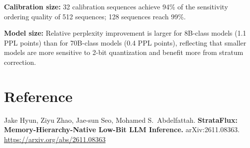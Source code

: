 \documentclass[10pt,twocolumn]{article}
\begin{document}
\textbf{Calibration size:} 32 calibration sequences achieve 94\% of the
sensitivity ordering quality of 512 sequences; 128 sequences reach 99\%.

\textbf{Model size:} Relative perplexity improvement is larger for
8B-class models (1.1 PPL points) than for 70B-class models (0.4 PPL
points), reflecting that smaller models are more sensitive to 2-bit
quantization and benefit more from stratum correction.

\section*{Reference}

Jake Hyun, Ziyu Zhao, Jae-sun Seo, Mohamed S.\ Abdelfattah.
\textbf{StrataFlux: Memory-Hierarchy-Native Low-Bit LLM Inference.}
arXiv:2611.08363.
\url{https://arxiv.org/abs/2611.08363}
\end{document}
